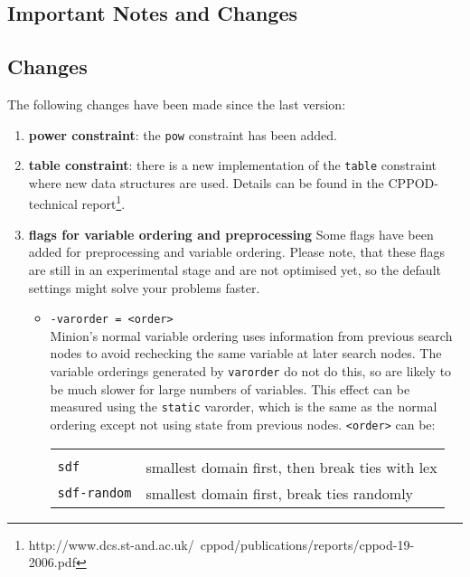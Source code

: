\documentclass{article}
\begin{document}
\begin{small}
\clearpage
\section{Important Notes and Changes}\label{sect_notes}

\subsection*{Changes}

The following changes have been made since the last version:

\begin{enumerate}
  \item \textbf{power constraint}: the \texttt{pow} constraint has been added.
  \item \textbf{table constraint}: there is a new implementation of the \texttt{table}
   constraint where new data structures are used. Details can be found 
   in the CPPOD-technical
   report\footnote{http://www.dcs.st-and.ac.uk/~cppod/publications/reports/cppod-19-2006.pdf}.
 \item \textbf{flags for variable ordering and preprocessing}
   Some flags have been added for preprocessing and variable
   ordering. Please note, that these flags are still in an
   experimental stage and are not optimised yet, so the default settings
   might solve your problems faster.
   \begin{itemize}
      \item \texttt{-varorder = <order>}\\
	{ \sc Minion}'s normal variable ordering uses information from  
        previous search nodes to avoid rechecking the same variable at later  
        search nodes. The variable orderings generated by \texttt{varorder} do not  
        do this, so are likely to be much slower for large numbers of  
        variables. This effect can be measured using the \texttt{static} varorder,  
        which is the same as the normal ordering except not using state from  
        previous nodes. \texttt{<order>} can be:\\
      \begin{tabular}{ll}
	& \\
	\texttt{sdf} & smallest domain first, then break ties with lex \\
	\texttt{sdf-random} & smallest domain first, break ties randomly\\

\end{tabular}
\end{itemize}
\end{enumerate}
\end{small}
\end{document}
